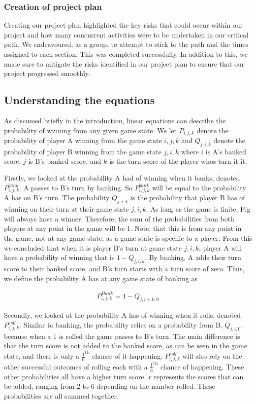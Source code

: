 \documentclass[a4paper,titlepage]{article}
\begin{document}
\subsubsection{Creation of project plan}
Creating our project plan highlighted the key risks that could occur within our project and how many concurrent activities were to be undertaken in our critical path. We endeavoured, as a group, to attempt to stick to the path and the times assigned to each section. This was completed successfully.
In addition to this, we made sure to mitigate the risks identified in our project plan to ensure that our project progressed smoothly.

\subsection{Understanding the equations}

As discussed briefly in the introduction, linear equations can describe the probability of winning from any given game state. We let $P_{i,j,k}$ denote the probability of player A winning from the game state $i,j,k$ and $Q_{j,i,k}$ denote the probability of player B winning from the game state $j,i,k$ where $i$ is A's banked score, $j$ is B's banked score, and $k$ is the turn score of the player whos turn it it.

Firstly, we looked at the probability A had of winning when it banks, denoted $P^{bank}_{i,j,k}$. A passes to B's turn by banking. So $P^{bank}_{i,j,k}$ will be equal to the probability A has on B's turn. The probability $Q_{j,i,k}$ is the probability that player B has of winning on their turn at their game state $j,i,k$. As long as the game is finite, Pig will always have a winner. Therefore, the sum of the probabilities from both players at any point in the game will be $1$. Note, that this is from any point in the game, not at any game state, as a game state is specific to a player. From this we concluded that when it is player B's turn at game state $j,i,k$, player A will have a probability of winning that is $1-Q_{j,i,k}$. By banking, A adds their turn score to their banked score, and B's turn starts with a turn score of zero. Thus, we define the probability A has at any game state of banking as

\begin{align*}
P^{Bank}_{i,j,k} = 1-Q_{j,i+k,0}
\end{align*}

Secondly, we looked at the probability A has of winning when it rolls, denoted $P^{roll}_{i,j,k}$. Similar to banking, the probability relies on a probability from B, $Q_{j,i,0}$, because when a $1$ is rolled the game passes to B's turn. The main difference is that the turn score is not added to the banked score, as can be seen in the game state, and there is only a $\frac{1}{6}^\text{th}$ chance of it happening. $P^{roll}_{i,j,k}$ will also rely on the other successful outcomes of rolling each with a $\frac{1}{6}^\text{th}$ chance of happening. These other probabilities all have a higher turn score. $r$ represents the scores that can be added, ranging from $2$ to $6$ depending on the number rolled. These probabilities are all summed together.
\end{document}
